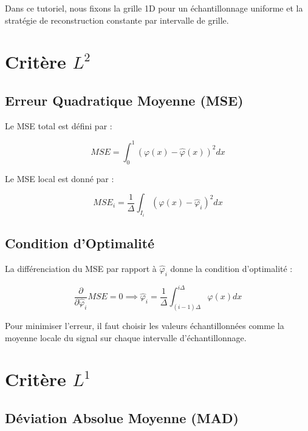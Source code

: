 \documentclass[12pt]{article}
\begin{document}
Dans ce tutoriel, nous fixons la grille 1D pour un échantillonnage uniforme et la stratégie de reconstruction constante par intervalle de grille.

\section{Critère $L^2$}

\subsection{Erreur Quadratique Moyenne (MSE)}

Le MSE total est défini par :

\begin{equation}
MSE = \int_0^1 (\varphi(x) - \hat{\varphi}(x))^2 dx
\end{equation}

Le MSE local est donné par :

\begin{equation}
MSE_i = \frac{1}{\Delta} \int_{I_i} (\varphi(x) - \hat{\varphi}_i)^2 dx
\end{equation}

\subsection{Condition d'Optimalité}

La différenciation du MSE par rapport à $\hat{\varphi}_i$ donne la condition d'optimalité :

\begin{equation}
\frac{\partial}{\partial \hat{\varphi}_i} MSE = 0 \implies \hat{\varphi}_i = \frac{1}{\Delta} \int_{(i-1)\Delta}^{i\Delta} \varphi(x) dx
\end{equation}

\begin{tcolorbox}[title={Vulgarisation simple}]
Pour minimiser l'erreur, il faut choisir les valeurs échantillonnées comme la moyenne locale du signal sur chaque intervalle d'échantillonnage.
\end{tcolorbox}

\section{Critère $L^1$}

\subsection{Déviation Absolue Moyenne (MAD)}
\end{document}
